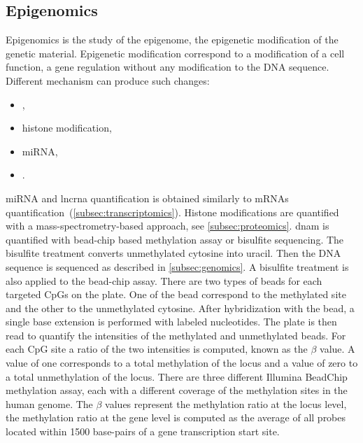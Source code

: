 \documentclass[../main.tex]{subfiles}
\begin{document}
 \subsection{Epigenomics}
     Epigenomics is the study of the epigenome, the epigenetic modification of the genetic material.
     Epigenetic modification correspond to a modification of a cell function, a gene regulation without any modification to the DNA sequence.
     Different mechanism can produce such changes:
     \begin{itemize}
         \item {},
         \item histone modification,
         \item miRNA,
         \item {}.
     \end{itemize}
     miRNA and \gls{lncrna} quantification is obtained similarly to mRNAs quantification~(\cref{subsec:transcriptomics}).
     Histone modifications are quantified with a mass-spectrometry-based approach, see \cref{subsec:proteomics}.
     \Gls{dnam} is quantified with bead-chip based methylation assay or bisulfite sequencing.
     The bisulfite treatment converts unmethylated cytosine into uracil.
     Then the DNA sequence is sequenced as described in \cref{subsec:genomics}.
     A bisulfite treatment is also applied to the bead-chip assay.
     There are two types of beads for each targeted CpGs on the plate.
     One of the bead correspond to the methylated site and the other to the unmethylated cytosine.
     After hybridization with the bead, a single base extension is performed with labeled nucleotides.
     The plate is then read to quantify the intensities of the methylated and unmethylated beads.
     For each CpG site a ratio of the two intensities is computed, known as the \(\beta\) value.
     A value of one corresponds to a total methylation of the locus and a value of zero to a total unmethylation of the locus.
     There are three different Illumina BeadChip methylation assay, each with a different coverage of the methylation sites in the human genome.
     The \(\beta\) values represent the methylation ratio at the locus level, the methylation ratio at the gene level is computed as the average of all probes located within 1500 base-pairs of a gene transcription start site.
\end{document}
